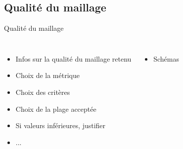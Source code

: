 \subsection{Qualité du maillage}
\label{sec:Qualité du maillage}

\begin{frame}[c]{Qualité du maillage}
  \begin{columns}
    \begin{itemize}
        \item Infos sur la qualité du maillage retenu
        \item Choix de la métrique
        \item Choix des critères
        \item Choix de la plage acceptée
        \item Si valeurs inférieures, justifier
        \item ...
    \end{itemize}
    \begin{itemize}
        \item Schémas
    \end{itemize}
  \end{columns}
\end{frame}

		
